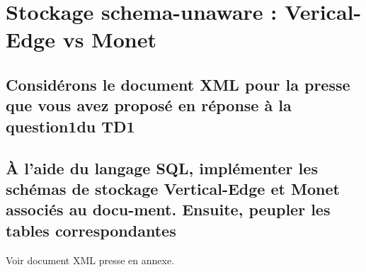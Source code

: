 \chapter{Stockage schema-unaware : Verical-Edge vs Monet}
\section{Considérons le document XML pour la presse que vous avez proposé en réponse à la question1du TD1}
\section{À l’aide du langage SQL, implémenter les schémas de stockage Vertical-Edge et Monet associés au docu-ment. Ensuite, peupler les tables correspondantes}
Voir document XML presse en annexe.

